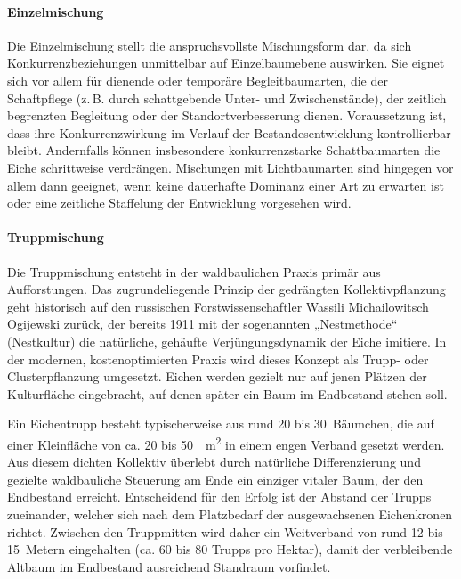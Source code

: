 \documentclass[twocolumn, bibliography=totoc, abstract=true]{scrartcl}
\begin{document}
\paragraph{Einzelmischung}

Die Einzelmischung stellt die anspruchsvollste Mischungsform dar, da sich Konkurrenzbeziehungen unmittelbar auf Einzelbaumebene auswirken. Sie eignet sich vor allem für dienende oder temporäre Begleitbaumarten, die der Schaftpflege (z.\,B. durch schattgebende Unter- und Zwischenstände), der zeitlich begrenzten Begleitung oder der Standortverbesserung dienen. Voraussetzung ist, dass ihre Konkurrenzwirkung im Verlauf der Bestandesentwicklung kontrollierbar bleibt. Andernfalls können insbesondere konkurrenzstarke Schattbaumarten die Eiche schrittweise verdrängen. Mischungen mit Lichtbaumarten sind hingegen vor allem dann geeignet, wenn keine dauerhafte Dominanz einer Art zu erwarten ist oder eine zeitliche Staffelung der Entwicklung vorgesehen wird.

\paragraph{Truppmischung}

Die Truppmischung entsteht in der waldbaulichen Praxis primär aus Aufforstungen. Das zugrundeliegende Prinzip der gedrängten Kollektivpflanzung geht historisch auf den russischen Forstwissenschaftler Wassili Michailowitsch Ogijewski zurück, der bereits 1911 mit der sogenannten „Nestmethode“ (Nestkultur) die natürliche, gehäufte Verjüngungsdynamik der Eiche imitiere. In der modernen, kostenoptimierten Praxis wird dieses Konzept als Trupp- oder Clusterpflanzung umgesetzt. Eichen werden gezielt nur auf jenen Plätzen der Kulturfläche eingebracht, auf denen später ein Baum im Endbestand stehen soll.

Ein Eichentrupp besteht typischerweise aus rund 20 bis 30~Bäumchen, die auf einer Kleinfläche von ca. 20 bis 50~\qty{}{\m\squared} in einem engen Verband gesetzt werden. Aus diesem dichten Kollektiv überlebt durch natürliche Differenzierung und gezielte waldbauliche Steuerung am Ende ein einziger vitaler Baum, der den Endbestand erreicht. Entscheidend für den Erfolg ist der Abstand der Trupps zueinander, welcher sich nach dem Platzbedarf der ausgewachsenen Eichenkronen richtet. Zwischen den Truppmitten wird daher ein Weitverband von rund 12 bis 15~Metern eingehalten (ca. 60 bis 80 Trupps pro Hektar), damit der verbleibende Altbaum im Endbestand ausreichend Standraum vorfindet.
\end{document}
